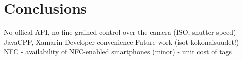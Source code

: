 \documentclass[thesis.tex]{subfiles}
\begin{document}
\chapter{Conclusions}
\label{chapter:conclusions}

No offical API, no fine grained control over the camera (ISO, shutter speed)
JavaCPP, Xamarin
Developer convenience
Future work (isot kokonaisuudet!)
NFC
- availability of NFC-enabled smartphones (minor)
- unit cost of tags
\end{document}

